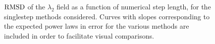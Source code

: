 \begin{figure}[htpb]
    \centering
    
    \caption[$\rmsd$ of the $\lambda_{2}$ field as a function of numerical
    step length, for the singlestep methods considered]{
    $\rmsd$ of the $\lambda_{2}$ field as a function of numerical step length,
    for the singlestep methods considered. Curves with slopes corresponding to
    the expected power laws in error for the various methods are included in
    order to facilitate visual comparisons.}
    \label{fig:lmbd2_err_fixed}
\end{figure}

